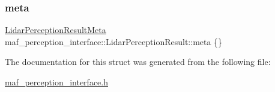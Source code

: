 \subsubsection{\texorpdfstring{meta}{meta}}
{\footnotesize\ttfamily \hyperlink{structmaf__perception__interface_1_1LidarPerceptionResultMeta}{Lidar\+Perception\+Result\+Meta} maf\+\_\+perception\+\_\+interface\+::\+Lidar\+Perception\+Result\+::meta \{\}}



The documentation for this struct was generated from the following file\+:\begin{DoxyCompactItemize}
\item 
\hyperlink{maf__perception__interface_8h}{maf\+\_\+perception\+\_\+interface.\+h}\end{DoxyCompactItemize}
